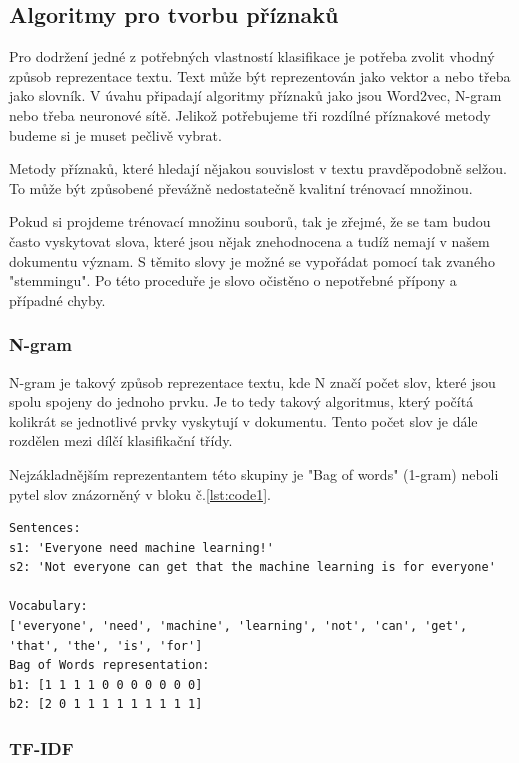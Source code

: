 \documentclass[ 12pt, a4paper]{article}
\begin{document}
\subsection{Algoritmy pro tvorbu příznaků}
Pro dodržení jedné z potřebných vlastností klasifikace je potřeba zvolit vhodný způsob reprezentace textu. Text může být reprezentován jako vektor a nebo třeba jako slovník. V úvahu připadají algoritmy příznaků jako jsou Word2vec, N-gram nebo třeba neuronové sítě. Jelikož potřebujeme tři rozdílné příznakové metody budeme si je muset pečlivě vybrat.

Metody příznaků, které hledají nějakou souvislost v textu pravděpodobně selžou. To může být způsobené převážně nedostatečně kvalitní trénovací množinou.

Pokud si projdeme trénovací množinu souborů, tak je zřejmé, že se tam budou často vyskytovat slova, které jsou nějak znehodnocena a tudíž nemají v našem dokumentu význam. S těmito slovy je možné se vypořádat pomocí tak zvaného "stemmingu". Po této proceduře je slovo očistěno o nepotřebné přípony a případné chyby. 


\subsubsection{N-gram}
N-gram je takový způsob reprezentace textu, kde N značí počet slov, které jsou spolu spojeny do jednoho prvku. Je to tedy takový algoritmus, který počítá kolikrát se jednotlivé prvky vyskytují v dokumentu. Tento počet slov je dále rozdělen mezi dílčí klasifikační třídy.

\newpage
Nejzákladnějším reprezentantem této skupiny je "Bag of words" (1-gram) neboli pytel slov znázorněný v bloku č.\ref{lst:code1}. 
 
\begin{lstlisting}[caption={Ukázka příznakové metody "bag of words"},label={lst:code1}]
Sentences:
s1: 'Everyone need machine learning!'
s2: 'Not everyone can get that the machine learning is for everyone'

Vocabulary:
['everyone', 'need', 'machine', 'learning', 'not', 'can', 'get', 'that', 'the', 'is', 'for']
Bag of Words representation:
b1: [1 1 1 1 0 0 0 0 0 0 0]
b2: [2 0 1 1 1 1 1 1 1 1 1]
\end{lstlisting}

\subsubsection{TF-IDF}
\end{document}
